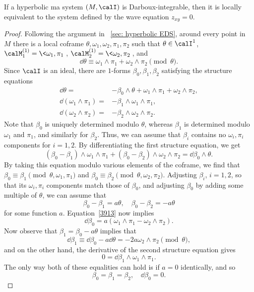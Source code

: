 \begin{prop}
    If a hyperbolic \gls{ma} system $(M,\calI)$ is Darboux-integrable, then it is locally equivalent to the system defined by the wave equation $z_{xy}=0$.
\end{prop}
\begin{proof}
    Following the argument in \subsect~\ref{sec: hyperbolic EDS}, around every point in $M$ there is a local coframe $\theta,\omega_1,\omega_2,\pi_1,\pi_2$ such that $\theta\in\calI^1$, $\calM_1^{(1)}=\<\omega_1,\pi_1\>$, $\calM_2^{(1)}=\<\omega_2,\pi_2\>$, and 
    \[\dd\theta\equiv \omega_1\wedge\pi_1 +\omega_2\wedge\pi_2 \pmod{\theta}.\]
    Since $\calI$ is an ideal, there are $1$-forms $\beta_0,\beta_1,\beta_2$ satisfying the structure equations 
    \begin{align}
        \dd\theta=&-\beta_0\wedge\theta +\omega_1\wedge\pi_1+\omega_2\wedge\pi_2,\\
        \dd(\omega_1\wedge\pi_1)=&-\beta_1\wedge\omega_1\wedge\pi_1,\\
        \dd(\omega_2\wedge\pi_2)=&-\beta_2\wedge \omega_2\wedge\pi_2.
    \end{align}
    Note that $\beta_0$ is uniquely determined modulo $\theta$, whereas $\beta_1$ is determined modulo $\omega_1$ and $\pi_1$, and similarly for $\beta_2$. Thus, we can assume that $\beta_i$ contains no $\omega_i,\pi_i$ components for $i=1,2$. By differentiating the first structure equation, we get 
    \[(\beta_0-\beta_1)\wedge\omega_1\wedge\pi_1+(\beta_0-\beta_2)\wedge\omega_2\wedge\pi_2=\dd\beta_0\wedge\theta.\label{3913}\]
    By taking this equation modulo various elements of the coframe, we find that $\beta_0\equiv \beta_1\pmod{\theta,\omega_1,\pi_1}$ and $\beta_0\equiv \beta_2\pmod{\theta,\omega_2,\pi_2}$. Adjusting $\beta_i$, $i=1,2$, so that its $\omega_i,\pi_i$ components match those of $\beta_0$, and adjusting $\beta_0$ by adding some multiple of $\theta$,
    we can assume that 
    \[\beta_0-\beta_1=a\theta,\quad \beta_0-\beta_2=-a\theta\] 
    for some function $a$. Equation~\ref{3913} now implies 
    \[\dd\beta_0=a(\omega_1\wedge\pi_1-\omega_2\wedge\pi_2).\]
    Now observe that $\beta_1=\beta_0-a\theta$ implies that
    \[\dd \beta_1\equiv \dd\beta_0-a\dd \theta=-2a\omega_2\wedge\pi_2\pmod{\theta},\]
    and on the other hand, the derivative of the second structure equation gives 
    \[0=\dd\beta_1\wedge\omega_1\wedge\pi_1.\]
    The only way both of these equalities can hold is if $a=0$ identically, and so 
    \[\beta_0=\beta_1=\beta_2,\quad \dd\beta_0=0.\]

\end{proof}
